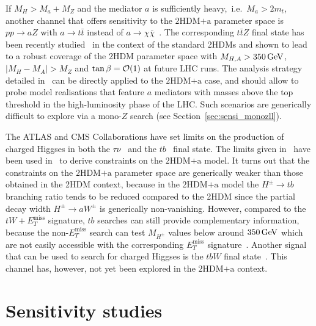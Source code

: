 \documentclass[a4paper, 11pt,notoc]{article}
\newcommand{\MET}{\ensuremath{E_T^\mathrm{miss}}\xspace}
\newcommand{\ma}{\ensuremath{M_{a}}\xspace}
\newcommand{\mH}{\ensuremath{M_{H}}\xspace}
\newcommand{\mHc}{\ensuremath{M_{H^{\pm}}}\xspace}
\newcommand{\hdma}{\ensuremath{\textrm{2HDM+a}}\xspace}
\begin{document}
If $\mH > \ma + M_Z$ and the mediator $a$ is sufficiently heavy,~i.e.~$\ma > 2 m_t$, another channel that offers sensitivity to the  $\hdma$ parameter space is $pp \to aZ$ with $a \to t \bar t$ instead of $a \to \chi \bar \chi$~\cite{GPHeidelberg}. The corresponding $t \bar t Z$ final state has been recently studied~\cite{Haisch:2018djm} in the context of the standard 2HDMs and shown to lead to a robust coverage of the 2HDM parameter space with $M_{H,A} > 350 \, {\rm GeV}$, $|M_H - M_A| > M_Z$ and $\tan \beta = {\cal O} (1)$ at future LHC runs.  The analysis strategy detailed in~\cite{Haisch:2018djm} can be directly applied to the \hdma case, and should allow to probe model realisations that feature $a$ mediators with masses above the top threshold in the high-luminosity phase of the LHC. Such scenarios are generically difficult to explore via a mono-$Z$ search (see Section~\ref{sec:sensi_monozll}).

The ATLAS and CMS Collaborations have set limits on the production of charged Higgses in both the $\tau \nu$~\cite{Aaboud:2016dig,CMS-PAS-HIG-16-031} and the $tb$~\cite{Aad:2015typ,Khachatryan:2015qxa,ATLAS:2016qiq} final state. The limits given in~\cite{ATLAS:2016qiq} have been used in~\cite{Pani:2017qyd} to derive constraints on the \hdma model. It turns out that  the constraints on the \hdma parameter space are generically weaker than those obtained in the 2HDM context, because in the \hdma model  the $H^\pm \to tb$ branching ratio tends to be reduced compared to the 2HDM since the partial decay width $H^\pm \to aW^\pm$ is generically non-vanishing.  However, compared to the $tW+\MET$ signature, $tb$ searches can still provide complementary information, because the non-$\MET$  search can test $\mHc$ values below around $350 \, {\rm GeV}$ which are not easily accessible with the corresponding $\MET$ signature~\cite{Pani:2017qyd}. Another signal that can be used to search for charged Higgses is the $tbW$ final state~\cite{Haisch:2018djm}. This channel has, however, not yet been explored in the \hdma context. 


\section{Sensitivity studies}
\label{sec:sensitivitystudies}
\end{document}
